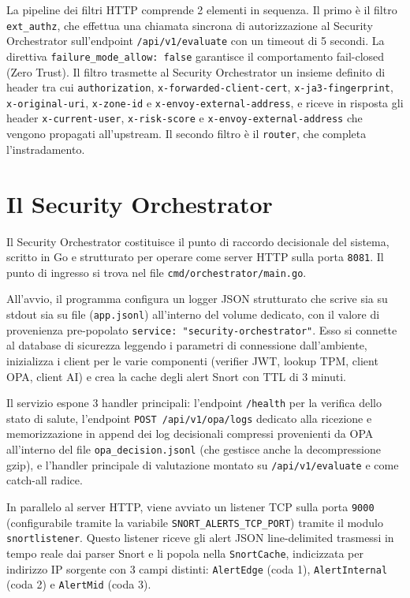 La pipeline dei filtri HTTP comprende 2 elementi in sequenza. Il primo è il filtro \texttt{ext\_authz}, che effettua una chiamata sincrona di autorizzazione al Security Orchestrator sull'endpoint \texttt{/api/v1/evaluate} con un timeout di 5 secondi. La direttiva \texttt{failure\_mode\_allow: false} garantisce il comportamento fail-closed (Zero Trust). Il filtro trasmette al Security Orchestrator un insieme definito di header tra cui \texttt{authorization}, \texttt{x-forwarded-client-cert}, \texttt{x-ja3-fingerprint}, \texttt{x-original-uri}, \texttt{x-zone-id} e \texttt{x-envoy-external-address}, e riceve in risposta gli header \texttt{x-current-user}, \texttt{x-risk-score} e \texttt{x-envoy-external-address} che vengono propagati all'upstream. Il secondo filtro è il \texttt{router}, che completa l'instradamento.

\section{Il Security Orchestrator}

Il Security Orchestrator costituisce il punto di raccordo decisionale del sistema, scritto in Go e strutturato per operare come server HTTP sulla porta \texttt{8081}. Il punto di ingresso si trova nel file \texttt{cmd/orchestrator/main.go}.

All'avvio, il programma configura un logger JSON strutturato che scrive sia su stdout sia su file (\texttt{app.jsonl}) all'interno del volume dedicato, con il valore di provenienza pre-popolato \texttt{service: "security-orchestrator"}. Esso si connette al database di sicurezza leggendo i parametri di connessione dall'ambiente, inizializza i client per le varie componenti (verifier JWT, lookup TPM, client OPA, client AI) e crea la cache degli alert Snort con TTL di 3 minuti.

Il servizio espone 3 handler principali: l'endpoint \texttt{/health} per la verifica dello stato di salute, l'endpoint \texttt{POST /api/v1/opa/logs} dedicato alla ricezione e memorizzazione in append dei log decisionali compressi provenienti da OPA all'interno del file \texttt{opa\_decision.jsonl} (che gestisce anche la decompressione gzip), e l'handler principale di valutazione montato su \texttt{/api/v1/evaluate} e come catch-all radice.

In parallelo al server HTTP, viene avviato un listener TCP sulla porta \texttt{9000} (configurabile tramite la variabile \texttt{SNORT\_ALERTS\_TCP\_PORT}) tramite il modulo \texttt{snortlistener}. Questo listener riceve gli alert JSON line-delimited trasmessi in tempo reale dai parser Snort e li popola nella \texttt{SnortCache}, indicizzata per indirizzo IP sorgente con 3 campi distinti: \texttt{AlertEdge} (coda 1), \texttt{AlertInternal} (coda 2) e \texttt{AlertMid} (coda 3).

